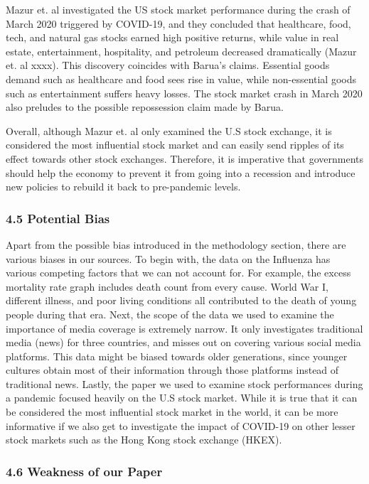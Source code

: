 \documentclass[
]{article}
\begin{document}
Mazur et. al investigated the US stock market performance during the
crash of March 2020 triggered by COVID-19, and they concluded that
healthcare, food, tech, and natural gas stocks earned high positive
returns, while value in real estate, entertainment, hospitality, and
petroleum decreased dramatically (Mazur et. al xxxx). This discovery
coincides with Barua's claims. Essential goods demand such as healthcare
and food sees rise in value, while non-essential goods such as
entertainment suffers heavy losses. The stock market crash in March 2020
also preludes to the possible repossession claim made by Barua.

Overall, although Mazur et. al only examined the U.S stock exchange, it
is considered the most influential stock market and can easily send
ripples of its effect towards other stock exchanges. Therefore, it is
imperative that governments should help the economy to prevent it from
going into a recession and introduce new policies to rebuild it back to
pre-pandemic levels.

\hypertarget{potential-bias}{%
\subsubsection{4.5 Potential Bias}\label{potential-bias}}

Apart from the possible bias introduced in the methodology section,
there are various biases in our sources. To begin with, the data on the
Influenza has various competing factors that we can not account for. For
example, the excess mortality rate graph includes death count from every
cause. World War I, different illness, and poor living conditions all
contributed to the death of young people during that era. Next, the
scope of the data we used to examine the importance of media coverage is
extremely narrow. It only investigates traditional media (news) for
three countries, and misses out on covering various social media
platforms. This data might be biased towards older generations, since
younger cultures obtain most of their information through those
platforms instead of traditional news. Lastly, the paper we used to
examine stock performances during a pandemic focused heavily on the U.S
stock market. While it is true that it can be considered the most
influential stock market in the world, it can be more informative if we
also get to investigate the impact of COVID-19 on other lesser stock
markets such as the Hong Kong stock exchange (HKEX).

\hypertarget{weakness-of-our-paper}{%
\subsubsection{4.6 Weakness of our Paper}\label{weakness-of-our-paper}}
\end{document}
